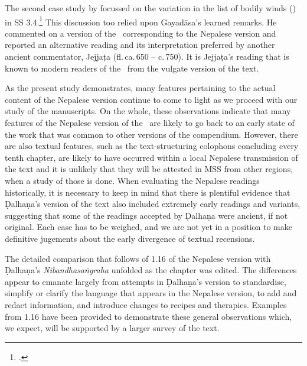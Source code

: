 The second case study by \citeauthor{kleb-2021b} focussed on the variation in the
list of bodily winds () in SS 3.4.\footcite{kleb-2021b}  This
discussion  too relied upon Gayadāsa's learned remarks. He commented on a version
of the \SS\ corresponding to the Nepalese version and reported an alternative
reading and its interpretation preferred by another ancient commentator, Jejjaṭa
(fl.\,ca.\,650 -- c.\,750). It is Jejjaṭa's reading that is known to modern
readers of the \SS\ from the vulgate version of the text.


As the present study demonstrates, many features pertaining to the actual
content of the Nepalese version continue to come to light as we proceed with our
study of the manuscripts.  On the whole, these observations indicate that many
features of the Nepalese version of the \SS\ are likely to go back to an early
state of the work that was common to other versions of the compendium. However,
there are also textual features, such as the text-structuring colophons concluding every
tenth chapter, are likely to have occurred within a local Nepalese transmission of
the text and it is unlikely that they will be attested in MSS from other regions,
when a study of those is done. When evaluating the Nepalese readings historically,
it is necessary to keep in mind that there is plentiful evidence that Ḍalhaṇa's
version of the text also included extremely early readings and variants,
suggesting that some of the readings accepted by Ḍalhaṇa were ancient, if not
original.  Each case has to be weighed, and we are not yet in a position to make 
definitive jugements about the early divergence of textual recensions. 

The detailed comparison that follows of 1.16 of the Nepalese version with
Ḍalhaṇa's \emph{Nibandhasaṅgraha} unfolded as the chapter was edited. The
differences appear to emanate largely from attempts in Ḍalhaṇa's version to
standardise, simplify or clarify the language that appears in the Nepalese
version, to add and redact information, and introduce changes to recipes and
therapies. Examples from 1.16 have been provided to demonstrate these general
observations which, we expect, will be supported by a larger survey of the text.

